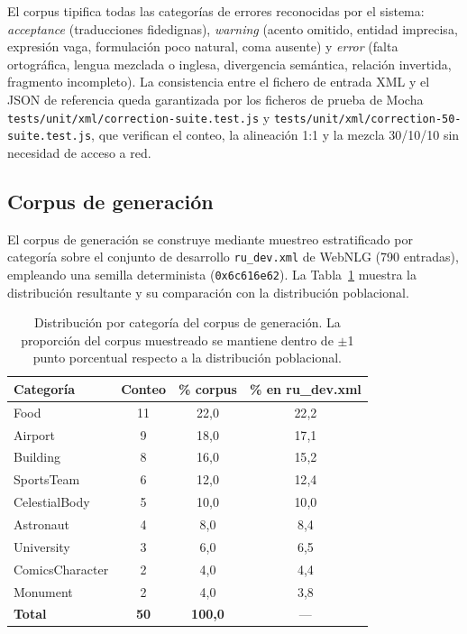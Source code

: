 El corpus tipifica todas las categorías de errores reconocidas por el sistema:
\textit{acceptance} (traducciones fidedignas), \textit{warning} (acento
omitido, entidad imprecisa, expresión vaga, formulación poco natural, coma
ausente) y \textit{error} (falta ortográfica, lengua mezclada o inglesa,
divergencia semántica, relación invertida, fragmento incompleto). La
consistencia entre el fichero de entrada XML y el JSON de referencia queda
garantizada por los ficheros de prueba de Mocha
\texttt{tests/unit/xml/correction-suite.test.js} y
\texttt{tests/unit/xml/correction-50-suite.test.js}, que verifican el conteo,
la alineación 1:1 y la mezcla 30/10/10 sin necesidad de acceso a red.

\subsection{Corpus de generación}

El corpus de generación se construye mediante muestreo estratificado por
categoría sobre el conjunto de desarrollo \texttt{ru\_dev.xml} de WebNLG (790
entradas), empleando una semilla determinista (\texttt{0x6c616e62}). La
Tabla~\ref{tab:corpus-generacion} muestra la distribución resultante y su
comparación con la distribución poblacional.

\begin{table}[ht]
	\centering
	\small
	\begin{tabular}{lccc}
		\hline
		\textbf{Categoría} & \textbf{Conteo} & \textbf{\% corpus} & \textbf{\% en ru\_dev.xml} \\
		\hline
		Food               & 11              & 22{,}0             & 22{,}2                     \\
		Airport            & 9               & 18{,}0             & 17{,}1                     \\
		Building           & 8               & 16{,}0             & 15{,}2                     \\
		SportsTeam         & 6               & 12{,}0             & 12{,}4                     \\
		CelestialBody      & 5               & 10{,}0             & 10{,}0                     \\
		Astronaut          & 4               & 8{,}0              & 8{,}4                      \\
		University         & 3               & 6{,}0              & 6{,}5                      \\
		ComicsCharacter    & 2               & 4{,}0              & 4{,}4                      \\
		Monument           & 2               & 4{,}0              & 3{,}8                      \\
		\hline
		\textbf{Total}     & \textbf{50}     & \textbf{100{,}0}   & ---                        \\
		\hline
	\end{tabular}
	\caption{Distribución por categoría del corpus de generación. La proporción
		del corpus muestreado se mantiene dentro de $\pm$1 punto porcentual respecto
		a la distribución poblacional.}
	\label{tab:corpus-generacion}
\end{table}

